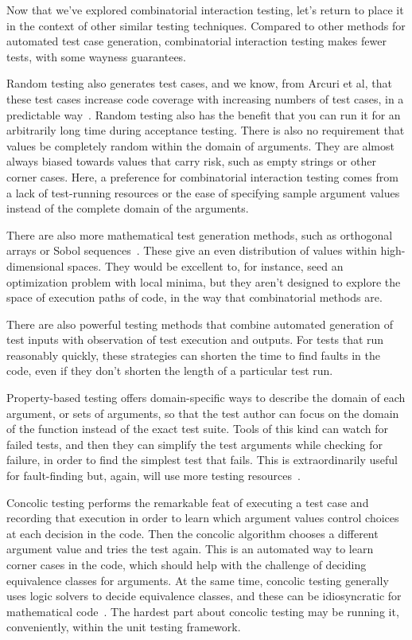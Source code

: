 \documentclass{juliacon}
\begin{document}
Now that we've explored combinatorial interaction testing, let's return to place it in the context of other similar testing techniques. Compared to other methods for automated test case generation, combinatorial interaction testing makes fewer tests, with some wayness guarantees.

\vskip 6pt
Random testing also generates test cases, and we know, from Arcuri et al, that these test cases increase code coverage with increasing numbers of test cases, in a predictable way~\cite{Arcuri2012-az}. Random testing also has the benefit that you can run it for an arbitrarily long time during acceptance testing. There is also no requirement that values be completely random within the domain of arguments. They are almost always biased towards values that carry risk, such as empty strings or other corner cases. Here, a preference for combinatorial interaction testing comes from a lack of test-running resources or the ease of specifying sample argument values instead of the complete domain of the arguments.

\vskip 6pt
There are also more mathematical test generation methods, such as orthogonal arrays or Sobol sequences~\cite{He2013-th}. These give an even distribution of values within high-dimensional spaces. They would be excellent to, for instance, seed an optimization problem with local minima, but they aren't designed to explore the space of execution paths of code, in the way that combinatorial methods are.

\vskip 6pt
There are also powerful testing methods that combine automated generation of test inputs with observation of test execution and outputs. For tests that run reasonably quickly, these strategies can shorten the time to find faults in the code, even if they don't shorten the length of a particular test run.

\vskip 6pt
Property-based testing offers domain-specific ways to describe the domain of each argument, or sets of arguments, so that the test author can focus on the domain of the function instead of the exact test suite. Tools of this kind can watch for failed tests, and then they can simplify the test arguments while checking for failure, in order to find the simplest test that fails. This is extraordinarily useful for fault-finding but, again, will use more testing resources~\cite{loscher2018automating}.

\vskip 6pt
Concolic testing performs the remarkable feat of executing a test case and recording that execution in order to learn which argument values control choices at each decision in the code. Then the concolic algorithm chooses a different argument value and tries the test again. This is an automated way to learn corner cases in the code, which should help with the challenge of deciding equivalence classes for arguments. At the same time, concolic testing generally uses logic solvers to decide equivalence classes, and these can be idiosyncratic for mathematical code~\cite{King1976-jt,Wang2018-xh}. The hardest part about concolic testing may be running it, conveniently, within the unit testing framework.
\end{document}
